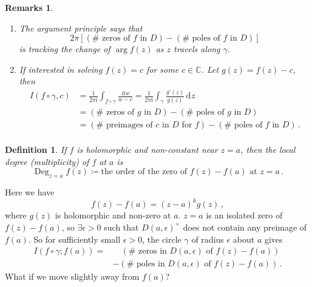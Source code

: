 \documentclass{article}
\theoremstyle{plain}\theoremheaderfont{\normalfont\itshape}\theorembodyfont{\rmfamily}\theoremseparator{.}\newtheorem*{rem}{Remark}\newtheorem*{ex}{Example}\newtheorem*{proof}{Proof}\newtheorem*{altp}{Alternative proof}\newtheorem*{con}{Consequences}\newtheorem*{notn}{Notations}\newtheorem*{cau}{Caution}\newtheorem*{term}{Terminology}\newtheorem*{keyex}{Key example}
\theoremstyle{plain}\theoremheaderfont{\normalfont\bfseries}\theorembodyfont{\rmfamily}\theoremseparator{.}\newtheorem{thm}{Theorem}[section]\newtheorem{lem}[thm]{Lemma}\newtheorem{prop}[thm]{Proposition}\newtheorem*{cor}{Corollary}\newtheorem{defn}[thm]{Definition}\newtheorem{clm}[thm]{Claim}\newtheorem{clminproof}{Claim}\newtheorem{leminproof}{Lemma}\newtheorem{app}{Application}
\theoremstyle{break}\theoremheaderfont{\normalfont\itshape}\theorembodyfont{\rmfamily}\theoremseparator{.\medskip}\newtheorem*{proofskip}{Proof}\newtheorem*{exs}{Examples}\newtheorem*{rems}{Remarks}\newtheorem*{rec}{Recall}\newtheorem*{ppts}{Properties}
\theoremstyle{break}\theoremheaderfont{\normalfont\bfseries}\theorembodyfont{\rmfamily}\theoremseparator{.\medskip}\newtheorem{lemskip}[thm]{Lemma}\newtheorem{defnskip}[thm]{Definition}\newtheorem{propskip}[thm]{Proposition}\newtheorem{thmskip}[thm]{Theorem}
\numberwithin{equation}{section}
\newcommand{\ii}{\mathrm{i}}
\DeclareMathOperator*{\Deg}{Deg}
\newcommand{\dd}[2][]{\,\mathrm{d}^{#1} #2}
\newcommand{\CC}{\mathbb{C}}
\begin{document}
    \begin{rems}
        \begin{enumerate}[topsep=0pt,label=(\roman*)]
            \item The argument principle says that
            \[2\pi[(\#\text{ zeros of }f\text{ in }D)-(\#\text{ poles of }f\text{ in }D)]\]
            is tracking the change of \(\arg f(z)\) as \(z\) travels along \(\gamma\).
            \item If interested in solving \(f(z)=c\) for some \(c\in\CC\). Let \(g(z)=f(z)-c\), then
            \begin{align*}
                I(f\circ\gamma,c)&=\frac{1}{2\pi \ii}\int_{f\circ\gamma}\frac{\dd{w}}{w-c}=\frac{1}{2\pi \ii}\int_\gamma\frac{g'(z)}{g(z)}\dd{z}\\
                &=(\#\text{ zeros of }g\text{ in }D)-(\#\text{ poles of }g\text{ in }D)\\
                &=(\#\text{ preimages of }c\text{ in }D\text{ for }f)-(\#\text{ poles of }f\text{ in }D)\,.\\
            \end{align*}
        \end{enumerate}
    \end{rems}
    \begin{defn}
        If \(f\) is holomorphic and non-constant near \(z=a\), then the \textit{local degree} (\textit{multiplicity}) of \(f\) at \(a\) is
        \[\Deg_{z=a}f(z)\coloneqq\text{the order of the zero of }f(z)-f(a)\text{ at }z=a\,.\]
    \end{defn}
    Here we have
    \[f(z)-f(a)=(z-a)^kg(z)\,,\]
    where \(g(z)\) is holomorphic and non-zero at \(a\). \(z=a\) is an isolated zero of \(f(z)-f(a)\), so \(\exists\epsilon>0\) such that \(D(a,\epsilon)^\times\) does not contain any preimage of \(f(a)\). So for sufficiently small \(\epsilon>0\), the circle \(\gamma\) of radius \(\epsilon\) about \(a\) gives
    \begin{align*}
        I(f\circ\gamma;f(a))=&\quad(\#\text{ zeros in }D(a,\epsilon)\text{ of }f(z)-f(a))\\
        &-(\#\text{ poles in }D(a,\epsilon)\text{ of }f(z)-f(a))\,.
    \end{align*}
    What if we move slightly away from \(f(a)\)?
    
\end{document}
